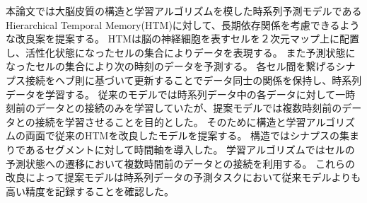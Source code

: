\abstract
本論文では大脳皮質の構造と学習アルゴリズムを模した時系列予測モデルであるHierarchical Temporal Memory(HTM)に対して、長期依存関係を考慮できるような改良案を提案する。
HTMは脳の神経細胞を表すセルを２次元マップ上に配置し、活性化状態になったセルの集合によりデータを表現する。
また予測状態になったセルの集合により次の時刻のデータを予測する。
各セル間を繋げるシナプス接続をヘブ則に基づいて更新することでデータ同士の関係を保持し、時系列データを学習する。
従来のモデルでは時系列データ中の各データに対して一時刻前のデータとの接続のみを学習していたが、提案モデルでは複数時刻前のデータとの接続を学習させることを目的とした。
そのために構造と学習アルゴリズムの両面で従来のHTMを改良したモデルを提案する。
構造ではシナプスの集まりであるセグメントに対して時間軸を導入した。
学習アルゴリズムではセルの予測状態への遷移において複数時間前のデータとの接続を利用する。
これらの改良によって提案モデルは時系列データの予測タスクにおいて従来モデルよりも高い精度を記録することを確認した。
